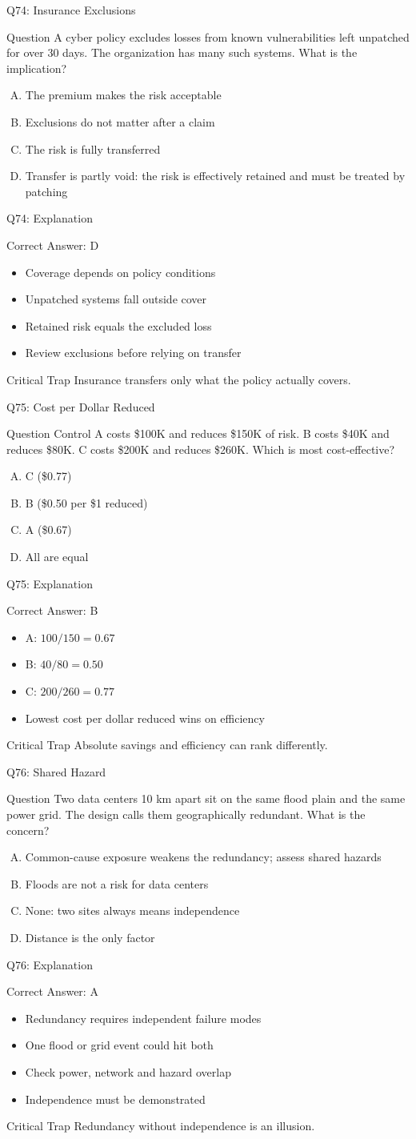 \documentclass[aspectratio=169]{beamer}
\newcommand{\hq}[7]{%
  \begin{frame}{Q#1: #2}
    \begin{block}{Question}
      #3
    \end{block}
    \begin{enumerate}[(A)]
      #4
    \end{enumerate}
  \end{frame}
  \begin{frame}{Q#1: Explanation}
    \begin{block}{Correct Answer: #5}
      \begin{itemize}
        #6
      \end{itemize}
    \end{block}
    \begin{alertblock}{Critical Trap}
      #7
    \end{alertblock}
  \end{frame}
}
\begin{document}
\hq{74}{Insurance Exclusions}
{A cyber policy excludes losses from known vulnerabilities left unpatched for over 30 days. The organization has many such systems. What is the implication?}
{\item The premium makes the risk acceptable
 \item Exclusions do not matter after a claim
 \item The risk is fully transferred
 \item Transfer is partly void: the risk is effectively retained and must be treated by patching}
{D}
{\item Coverage depends on policy conditions
 \item Unpatched systems fall outside cover
 \item Retained risk equals the excluded loss
 \item Review exclusions before relying on transfer}
{Insurance transfers only what the policy actually covers.}

\hq{75}{Cost per Dollar Reduced}
{Control A costs \$100K and reduces \$150K of risk. B costs \$40K and reduces \$80K. C costs \$200K and reduces \$260K. Which is most cost-effective?}
{\item C (\$0.77)
 \item B (\$0.50 per \$1 reduced)
 \item A (\$0.67)
 \item All are equal}
{B}
{\item A: $100/150 = 0.67$
 \item B: $40/80 = 0.50$
 \item C: $200/260 = 0.77$
 \item Lowest cost per dollar reduced wins on efficiency}
{Absolute savings and efficiency can rank differently.}

\hq{76}{Shared Hazard}
{Two data centers 10 km apart sit on the same flood plain and the same power grid. The design calls them geographically redundant. What is the concern?}
{\item Common-cause exposure weakens the redundancy; assess shared hazards
 \item Floods are not a risk for data centers
 \item None: two sites always means independence
 \item Distance is the only factor}
{A}
{\item Redundancy requires independent failure modes
 \item One flood or grid event could hit both
 \item Check power, network and hazard overlap
 \item Independence must be demonstrated}
{Redundancy without independence is an illusion.}
\end{document}
